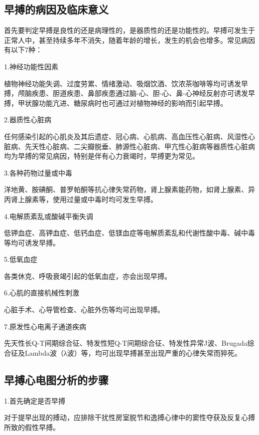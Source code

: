 \protect\hypertarget{text00018.htmlux5cux23subid130}{}{}

\subsection{早搏的病因及临床意义}

首先要判定早搏是良性的还是病理性的，是器质性的还是功能性的。早搏可发生于正常人中，甚至持续多年不消失，随着年龄的增长，发生的机会也增多。常见病因有以下7种：

1.神经功能性因素

植物神经功能失调、过度劳累、情绪激动、吸烟饮酒、饮浓茶咖啡等均可诱发早搏，颅脑疾患、胆道疾患、鼻部疾患通过脑-心、胆-心、鼻-心神经反射亦可诱发早搏，甲状腺功能亢进、糖尿病时也可通过对植物神经的影响而引起早搏。

2.器质性心脏病

任何感染引起的心肌炎及其后遗症、冠心病、心肌病、高血压性心脏病、风湿性心脏病、先天性心脏病、二尖瓣脱垂、肺源性心脏病、甲亢性心脏病等器质性心脏病均为早搏的常见病因，特别是伴有心力衰竭时，早搏更为常见。

3.各种药物过量或中毒

洋地黄、胺碘酮、普罗帕酮等抗心律失常药物，肾上腺素能药物，如肾上腺素、异丙肾上腺素等，使用过量或中毒时均可发生早搏。

4.电解质紊乱或酸碱平衡失调

低钾血症、高钾血症、低钙血症、低镁血症等电解质紊乱和代谢性酸中毒、碱中毒等均可诱发早搏。

5.低氧血症

各类休克、呼吸衰竭引起的低氧血症，亦会出现早搏。

6.心肌的直接机械性刺激

心脏手术、心导管检查、心脏外伤等均可出现早搏。

7.原发性心电离子通道疾病

先天性长Q-T间期综合征、特发性短Q-T间期综合征、特发性异常J波、Brugada综合征及Lambda波（λ波）等，均可出现早搏甚至出现严重的心律失常而猝死。

\protect\hypertarget{text00018.htmlux5cux23subid131}{}{}

\subsection{早搏心电图分析的步骤}

1.首先确定是否早搏

对于提早出现的搏动，应排除干扰性房室脱节和逸搏心律中的窦性夺获及反复心搏所致的假性早搏。


